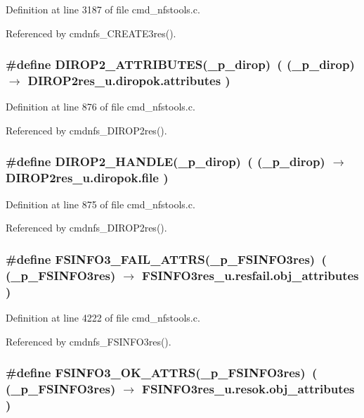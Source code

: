 Definition at line 3187 of file cmd\_\-nfstools.c.

Referenced by cmdnfs\_\-CREATE3res().
\subsubsection{\setlength{\rightskip}{0pt plus 5cm}\#define DIROP2\_\-ATTRIBUTES(\_\-p\_\-dirop)\ ( (\_\-p\_\-dirop) $\rightarrow$ DIROP2res\_\-u.diropok.attributes )}\label{cmd__nfstools_8c_a6}




Definition at line 876 of file cmd\_\-nfstools.c.

Referenced by cmdnfs\_\-DIROP2res().
\subsubsection{\setlength{\rightskip}{0pt plus 5cm}\#define DIROP2\_\-HANDLE(\_\-p\_\-dirop)\ ( (\_\-p\_\-dirop) $\rightarrow$ DIROP2res\_\-u.diropok.file )}\label{cmd__nfstools_8c_a5}




Definition at line 875 of file cmd\_\-nfstools.c.

Referenced by cmdnfs\_\-DIROP2res().
\subsubsection{\setlength{\rightskip}{0pt plus 5cm}\#define FSINFO3\_\-FAIL\_\-ATTRS(\_\-p\_\-FSINFO3res)\ ( (\_\-p\_\-FSINFO3res) $\rightarrow$ FSINFO3res\_\-u.resfail.obj\_\-attributes )}\label{cmd__nfstools_8c_a53}




Definition at line 4222 of file cmd\_\-nfstools.c.

Referenced by cmdnfs\_\-FSINFO3res().
\subsubsection{\setlength{\rightskip}{0pt plus 5cm}\#define FSINFO3\_\-OK\_\-ATTRS(\_\-p\_\-FSINFO3res)\ ( (\_\-p\_\-FSINFO3res) $\rightarrow$ FSINFO3res\_\-u.resok.obj\_\-attributes )}\label{cmd__nfstools_8c_a51}




